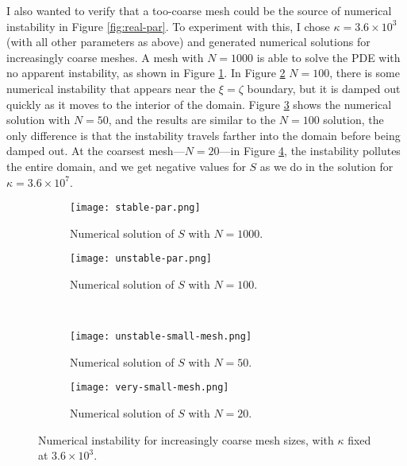 \documentclass{article}
\begin{document}
I also wanted to verify that a too-coarse mesh could be the source of
numerical instability in Figure \ref{fig:real-par}. To experiment with
this, I chose $\kappa = 3.6 \times 10^3$ (with all other parameters as
above) and generated numerical solutions for increasingly coarse
meshes. A mesh with $N = 1000$ is able to solve the PDE with no
apparent instability, as shown in Figure \ref{fig:stable-par}. In
Figure \ref{fig:unstable-par} $N = 100$, there is some numerical
instability that appears near the $\xi = \zeta$ boundary, but it is
damped out quickly as it moves to the interior of the domain. Figure
\ref{fig:unstable-small-mesh} shows the numerical solution with $N =
50$, and the results are similar to the $N = 100$ solution, the only
difference is that the instability travels farther into the domain
before being damped out. At the coarsest mesh---$N = 20$---in Figure
\ref{fig:very-small-mesh}, the instability pollutes the entire domain,
and we get negative values for $S$ as we do in the solution for
$\kappa = 3.6 \times 10^7$. 

\begin{figure}
  \centering
  \begin{subfigure}{0.48\textwidth}
    \texttt{[image: stable-par.png]}
    \caption{Numerical solution of $S$ with $N = 1000$.}
    \label{fig:stable-par}
  \end{subfigure}
  \hfill
  \begin{subfigure}{0.48\textwidth}
    \texttt{[image: unstable-par.png]}
    \caption{Numerical solution of $S$ with $N = 100$.}
    \label{fig:unstable-par}
  \end{subfigure}
  \\
  \begin{subfigure}{0.48\textwidth}
    \texttt{[image: unstable-small-mesh.png]}
    \caption{Numerical solution of $S$ with $N = 50$.}
    \label{fig:unstable-small-mesh}
  \end{subfigure}
  \hfill
  \begin{subfigure}{0.48\textwidth}
    \texttt{[image: very-small-mesh.png]}
    \caption{Numerical solution of $S$ with $N = 20$.}
    \label{fig:very-small-mesh}
  \end{subfigure}
  \caption[Numerical instability]{Numerical instability for
    increasingly coarse mesh sizes, with $\kappa$ fixed at $3.6\times10^3$.}
  \label{fig:numerical-instability}
\end{figure}
\end{document}
